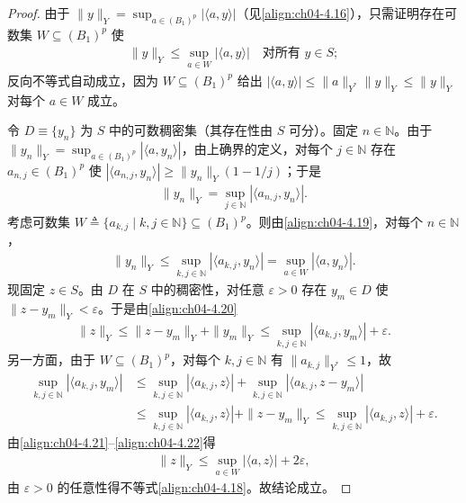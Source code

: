 \documentclass[../../main.tex]{subfiles}%
\begin{document}
\begin{proof}
由于 $\|y\|_Y=\sup_{a\in(B_1)^p}|\langle a,y\rangle|$（见\eqref{align:ch04-4.16}），只需证明存在可数集 $W\subseteq(B_1)^p$ 使
\begin{align}
\|y\|_Y\leqslant\sup_{a\in W}|\langle a,y\rangle|\quad\text{对所有 }y\in S; \label{align:ch04-4.18}
\end{align}
反向不等式自动成立，因为 $W\subseteq(B_1)^p$ 给出 $|\langle a,y\rangle|\leqslant\|a\|_{Y^*}\|y\|_Y\leqslant\|y\|_Y$ 对每个 $a\in W$ 成立。

令 $D\equiv\{y_n\}$ 为 $S$ 中的可数稠密集（其存在性由 $S$ 可分）。固定 $n\in\mathbb{N}$。由于 $\|y_n\|_Y=\sup_{a\in(B_1)^p}|\langle a,y_n\rangle|$，由上确界的定义，对每个 $j\in\mathbb{N}$ 存在 $a_{n,j}\in(B_1)^p$ 使 $|\langle a_{n,j},y_n\rangle|\geqslant\|y_n\|_Y(1-1/j)$；于是
\begin{align}
\|y_n\|_Y=\sup_{j\in\mathbb{N}}|\langle a_{n,j},y_n\rangle|. \label{align:ch04-4.19}
\end{align}
考虑可数集 $W\triangleq \{a_{k,j}\mid k,j\in\mathbb{N}\}\subseteq(B_1)^p$。则由\eqref{align:ch04-4.19}，对每个 $n\in\mathbb{N}$，
\begin{align}
\|y_n\|_Y\leqslant\sup_{k,j\in\mathbb{N}}|\langle a_{k,j},y_n\rangle|=\sup_{a\in W}|\langle a,y_n\rangle|. \label{align:ch04-4.20}
\end{align}
现固定 $z\in S$。由 $D$ 在 $S$ 中的稠密性，对任意 $\varepsilon>0$ 存在 $y_m\in D$ 使 $\|z-y_m\|_Y<\varepsilon$。于是由\eqref{align:ch04-4.20}
\begin{align}
\|z\|_Y\leqslant\|z-y_m\|_Y+\|y_m\|_Y\leqslant\sup_{k,j\in\mathbb{N}}|\langle a_{k,j},y_m\rangle|+\varepsilon. \label{align:ch04-4.21}
\end{align}
另一方面，由于 $W\subseteq(B_1)^p$，对每个 $k,j\in\mathbb{N}$ 有 $\|a_{k,j}\|_{Y^*}\leqslant1$，故
\begin{align}
\sup_{k,j\in\mathbb{N}}|\langle a_{k,j},y_m\rangle|
&\leqslant\sup_{k,j\in\mathbb{N}}|\langle a_{k,j},z\rangle|+\sup_{k,j\in\mathbb{N}}|\langle a_{k,j},z-y_m\rangle|\nonumber\\
&\leqslant\sup_{k,j\in\mathbb{N}}|\langle a_{k,j},z\rangle|+\|z-y_m\|_Y\leqslant\sup_{k,j\in\mathbb{N}}|\langle a_{k,j},z\rangle|+\varepsilon. \label{align:ch04-4.22}
\end{align}
由\eqref{align:ch04-4.21}--\eqref{align:ch04-4.22}得
\begin{align*}
\|z\|_Y\leqslant\sup_{a\in W}|\langle a,z\rangle|+2\varepsilon,
\end{align*}
由 $\varepsilon>0$ 的任意性得不等式\eqref{align:ch04-4.18}。故结论成立。
\end{proof}
\end{document}
